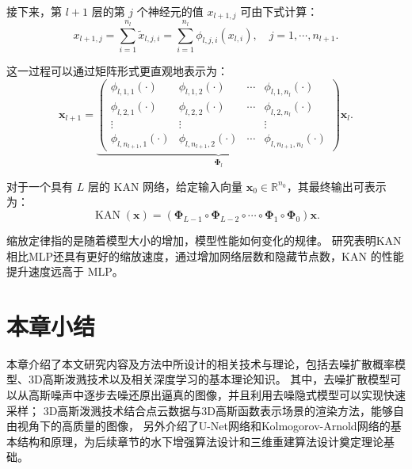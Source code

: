 接下来，第 $l+1$ 层的第 $j$ 个神经元的值 $x_{l+1,j}$ 可由下式计算：
\begin{equation}
    x_{l+1, j}=\sum_{i=1}^{n_l} \tilde{x}_{l, j, i}=\sum_{i=1}^{n_l} \phi_{l, j, i}\left(x_{l, i}\right), \quad j=1, \cdots, n_{l+1}.
\end{equation}

这一过程可以通过矩阵形式更直观地表示为：
\begin{equation}
    \mathbf{x}_{l+1}=\underbrace{\left(\begin{array}{cccc}\phi_{l, 1,1}(\cdot) & \phi_{l, 1,2}(\cdot) & \cdots & \phi_{l, 1, n_l}(\cdot) \\ \phi_{l, 2,1}(\cdot) & \phi_{l, 2,2}(\cdot) & \cdots & \phi_{l, 2, n_l}(\cdot) \\ \vdots & \vdots & & \vdots \\ \phi_{l, n_{l+1}, 1}(\cdot) & \phi_{l, n_{l+1}, 2}(\cdot) & \cdots & \phi_{l, n_{l+1}, n_l}(\cdot)\end{array}\right)}_{\boldsymbol{\Phi}_l} \mathbf{x}_l.
\end{equation}

对于一个具有 $L$ 层的 KAN 网络，给定输入向量 $\mathbf{x}_0 \in \mathbb{R}^{n_0}$，其最终输出可表示为：
\begin{equation}
    \operatorname{KAN}(\mathbf{x})=\left(\boldsymbol{\Phi}_{L-1} \circ \boldsymbol{\Phi}_{L-2} \circ \cdots \circ \boldsymbol{\Phi}_1 \circ \boldsymbol{\Phi}_0\right) \mathbf{x}.
\end{equation}

缩放定律指的是随着模型大小的增加，模型性能如何变化的规律。
研究表明KAN相比MLP还具有更好的缩放速度，通过增加网络层数和隐藏节点数，KAN 的性能提升速度远高于 MLP。

\section{本章小结}
本章介绍了本文研究内容及方法中所设计的相关技术与理论，包括去噪扩散概率模型、3D高斯泼溅技术以及相关深度学习的基本理论知识。
其中，去噪扩散模型可以从高斯噪声中逐步去噪还原出逼真的图像，并且利用去噪隐式模型可以实现快速采样；
3D高斯泼溅技术结合点云数据与3D高斯函数表示场景的渲染方法，能够自由视角下的高质量的图像，
另外介绍了U-Net网络和Kolmogorov-Arnold网络的基本结构和原理，为后续章节的水下增强算法设计和三维重建算法设计奠定理论基础。
